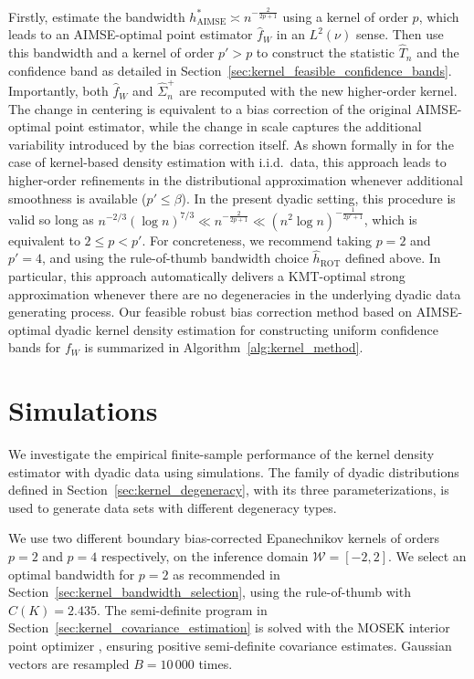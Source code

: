 \documentclass[11pt,lof]{puthesis}
\newcommand{\cW}{\ensuremath{\mathcal{W}}}
\DeclareMathOperator{\AIMSE}{AIMSE}
\DeclareMathOperator{\ROT}{ROT}
\theoremstyle{break}
\theoremstyle{proof}
\begin{document}
Firstly, estimate the bandwidth $h^*_{\AIMSE}\asymp n^{-\frac{2}{2p+1}}$ using a
kernel of order $p$, which leads to an AIMSE-optimal point estimator
$\hat{f}_W$ in an $L^2(\nu)$ sense. Then use this bandwidth and a kernel of
order $p' > p$ to construct the statistic $\hat T_n$ and the confidence band as
detailed in Section~\ref{sec:kernel_feasible_confidence_bands}. Importantly,
both $\hat{f}_W$ and $\hat{\Sigma}^+_n$ are recomputed with the new higher-order
kernel. The change in centering is equivalent to a bias correction of the
original AIMSE-optimal point estimator, while the change in scale captures the
additional variability introduced by the bias correction itself. As shown
formally in \citet{calonico2018effect, calonico2022coverage} for the case of
kernel-based density estimation with i.i.d.\ data, this approach leads to
higher-order refinements in the distributional approximation whenever additional
smoothness is available ($p'\leq\beta$). In the present dyadic setting, this
procedure is valid so long as $n^{-2/3} (\log n)^{7/3} \ll n^{-\frac{2}{2p+1}}
\ll (n^2 \log n)^{-\frac{1}{2p' + 1}}$,
which is equivalent to $2 \leq p < p'$.
For concreteness, we recommend taking $p = 2$ and $p' = 4$,
and using the rule-of-thumb bandwidth choice $\hat{h}_{\ROT}$ defined above.
In particular, this approach automatically delivers a KMT-optimal
strong approximation whenever there are no degeneracies in the
underlying dyadic data generating process.
Our feasible robust bias correction method based on AIMSE-optimal dyadic
kernel density estimation for constructing uniform confidence bands
for $f_W$ is summarized in Algorithm~\ref{alg:kernel_method}.

\section{Simulations}
\label{sec:kernel_simulations}

We investigate the empirical finite-sample performance of the kernel density
estimator with dyadic data using simulations. The family of dyadic
distributions defined in Section~\ref{sec:kernel_degeneracy}, with its three
parameterizations, is used to generate data sets with different degeneracy
types.

We use two different boundary bias-corrected Epanechnikov kernels of orders
$p=2$ and $p=4$ respectively, on the inference domain $\cW = [-2,2]$. We select
an optimal bandwidth for $p=2$ as recommended in
Section~\ref{sec:kernel_bandwidth_selection}, using the rule-of-thumb with
$C(K) = 2.435$. The semi-definite program in
Section~\ref{sec:kernel_covariance_estimation} is solved with the MOSEK
interior point
optimizer \citep{mosek}, ensuring positive semi-definite covariance estimates.
Gaussian vectors are resampled $B = 10\,000$ times.
\end{document}
